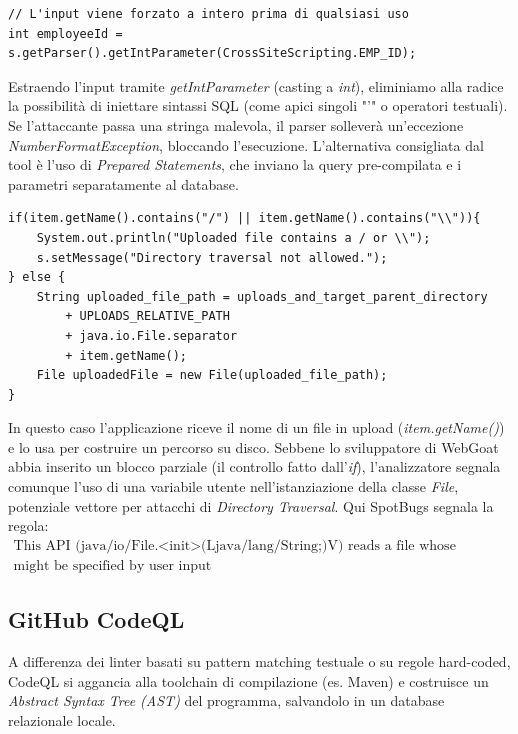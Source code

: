 \begin{lstlisting}
// L'input viene forzato a intero prima di qualsiasi uso
int employeeId = s.getParser().getIntParameter(CrossSiteScripting.EMP_ID);
\end{lstlisting}

Estraendo l'input tramite \textit{getIntParameter} (casting a \textit{int}), 
eliminiamo alla radice la possibilità di iniettare sintassi SQL (come apici singoli 
"'" o operatori testuali). Se l'attaccante passa una stringa malevola, il parser 
solleverà un'eccezione \textit{NumberFormatException}, bloccando l'esecuzione. 
L'alternativa consigliata dal tool è l'uso di \textit{Prepared Statements}, che 
inviano la query pre-compilata e i parametri separatamente al database.

\begin{lstlisting}
if(item.getName().contains("/") || item.getName().contains("\\")){
    System.out.println("Uploaded file contains a / or \\");
    s.setMessage("Directory traversal not allowed.");
} else {
    String uploaded_file_path = uploads_and_target_parent_directory 
        + UPLOADS_RELATIVE_PATH
        + java.io.File.separator
        + item.getName();
    File uploadedFile = new File(uploaded_file_path);
} 
\end{lstlisting}

In questo caso l'applicazione riceve il nome di un file in upload (\textit{item.getName()}) 
e lo usa per costruire un percorso su disco. Sebbene lo sviluppatore di WebGoat 
abbia inserito un blocco parziale (il controllo fatto dall'\textit{if}), l'analizzatore
segnala comunque l'uso di una variabile utente nell'istanziazione della classe \textit{File},
potenziale vettore per attacchi di \textit{Directory Traversal}. Qui SpotBugs segnala la regola:
\begin{gather*}
\text{This API (java/io/File.<init>(Ljava/lang/String;)V) reads a file whose location}
\\
\text{might be specified by user input}
\end{gather*}

\subsection{GitHub CodeQL}

A differenza dei linter basati su pattern matching testuale o su regole hard-coded, 
CodeQL si aggancia alla toolchain di compilazione (es. Maven) e costruisce un 
\textit{Abstract Syntax Tree (AST)} del programma, salvandolo in un database 
relazionale locale.

